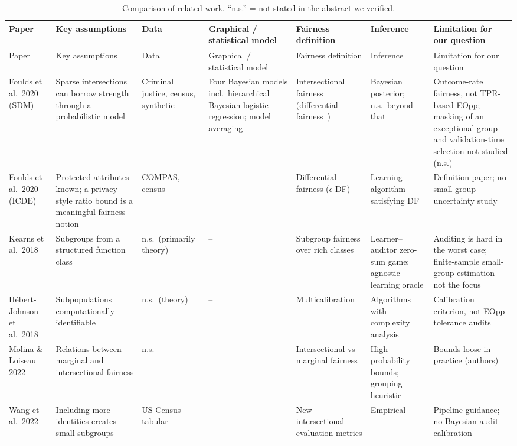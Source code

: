 \documentclass[10pt]{article}
\begin{document}
\begin{landscape}
\footnotesize
\begin{longtable}{@{}L{2.9cm}L{3.2cm}L{2.5cm}L{3.3cm}L{2.8cm}L{2.9cm}L{3.6cm}@{}}
\caption{Comparison of related work. ``n.s.'' = not stated in the abstract we verified.}\label{tab:comparison}\\
\toprule
Paper & Key assumptions & Data & Graphical / statistical model & Fairness definition & Inference & Limitation for our question \\
\midrule\endfirsthead
\toprule
Paper & Key assumptions & Data & Graphical / statistical model & Fairness definition & Inference & Limitation for our question \\
\midrule\endhead
\bottomrule\endfoot
Foulds et al.\ 2020 (SDM)~\cite{foulds2020bayes} & Sparse intersections can borrow strength through a probabilistic model & Criminal justice, census, synthetic & Four Bayesian models incl.\ hierarchical Bayesian logistic regression; model averaging & Intersectional fairness (differential fairness~\cite{foulds2020icde}) & Bayesian posterior; n.s.\ beyond that & Outcome-rate fairness, not TPR-based EOpp; masking of an exceptional group and validation-time selection not studied (n.s.) \\
Foulds et al.\ 2020 (ICDE)~\cite{foulds2020icde} & Protected attributes known; a privacy-style ratio bound is a meaningful fairness notion & COMPAS, census & -- & Differential fairness ($\epsilon$-DF) & Learning algorithm satisfying DF & Definition paper; no small-group uncertainty study \\
Kearns et al.\ 2018~\cite{kearns2018} & Subgroups from a structured function class & n.s.\ (primarily theory) & -- & Subgroup fairness over rich classes & Learner--auditor zero-sum game; agnostic-learning oracle & Auditing is hard in the worst case; finite-sample small-group estimation not the focus \\
H\'ebert-Johnson et al.\ 2018~\cite{hebert2018} & Subpopulations computationally identifiable & n.s.\ (theory) & -- & Multicalibration & Algorithms with complexity analysis & Calibration criterion, not EOpp tolerance audits \\
Molina \& Loiseau 2022~\cite{molina2022} & Relations between marginal and intersectional fairness & n.s. & -- & Intersectional vs marginal fairness & High-probability bounds; grouping heuristic & Bounds loose in practice (authors) \\
Wang et al.\ 2022~\cite{wang2022} & Including more identities creates small subgroups & US Census tabular & -- & New intersectional evaluation metrics & Empirical & Pipeline guidance; no Bayesian audit calibration \\

\end{longtable}
\end{landscape}
\end{document}
